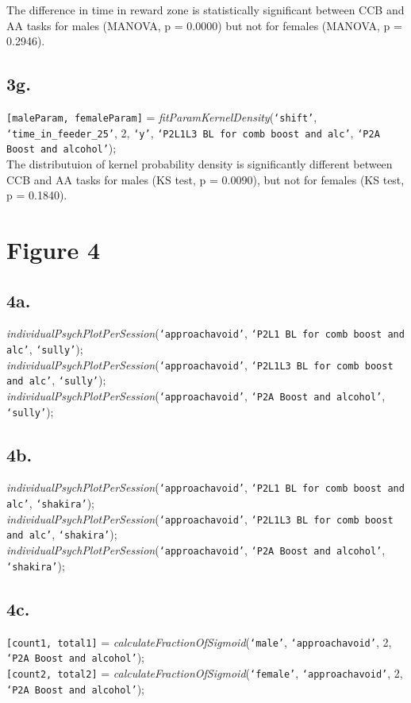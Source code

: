 \documentclass{article}
\begin{document}
The difference in time in reward zone is statistically significant between CCB and AA tasks for males (MANOVA, p = 0.0000) but not for females (MANOVA, p = 0.2946).

\subsection{3g.}
\texttt{[maleParam, femaleParam]} = \emph{fitParamKernelDensity}(\texttt{`shift'}, \texttt{`time\_in\_feeder\_25'}, 2, \texttt{`y'}, \texttt{`P2L1L3 BL for comb boost and alc'}, \texttt{`P2A Boost and alcohol'});\\

The distributuion of kernel probability density is significantly different between CCB and AA tasks for males (KS test, p = 0.0090), but not for females (KS test, p = 0.1840).


\section{Figure 4}
\subsection{4a.}
\emph{individualPsychPlotPerSession}(\texttt{`approachavoid'}, \texttt{`P2L1 BL for comb boost and alc'}, \texttt{`sully'});\\
\emph{individualPsychPlotPerSession}(\texttt{`approachavoid'}, \texttt{`P2L1L3 BL for comb boost and alc'}, \texttt{`sully'});\\
\emph{individualPsychPlotPerSession}(\texttt{`approachavoid'}, \texttt{`P2A Boost and alcohol'}, \texttt{`sully'});\\

\subsection{4b.}
\emph{individualPsychPlotPerSession}(\texttt{`approachavoid'}, \texttt{`P2L1 BL for comb boost and alc'}, \texttt{`shakira'});\\
\emph{individualPsychPlotPerSession}(\texttt{`approachavoid'}, \texttt{`P2L1L3 BL for comb boost and alc'}, \texttt{`shakira'});\\
\emph{individualPsychPlotPerSession}(\texttt{`approachavoid'}, \texttt{`P2A Boost and alcohol'}, \texttt{`shakira'});\\

\subsection{4c.}
\texttt{[count1, total1]} = \emph{calculateFractionOfSigmoid}(\texttt{`male'}, \texttt{`approachavoid'}, 2, \texttt{`P2A Boost and alcohol'});\\
\texttt{[count2, total2]} = \emph{calculateFractionOfSigmoid}(\texttt{`female'}, \texttt{`approachavoid'}, 2, \texttt{`P2A Boost and alcohol'});\\
\end{document}
